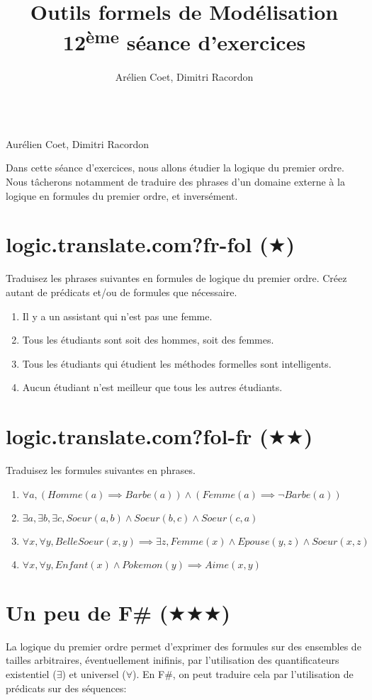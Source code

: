 \documentclass[a4paper, titlepage]{article}
\makeatletter
\numberwithin{figure}{section}
\numberwithin{table}{section}
\newcommand\objective[1]{\def\@objective{#1}}
\newcommand{\makecustomtitle}{%
	\begin{center}
		\huge\@title \\
		[1ex]\small Aurélien Coet, Dimitri Racordon \\
	\end{center}
	\@objective
}
\makeatother
\begin{document}
  \title{Outils formels de Modélisation \\ 12\textsuperscript{ème} séance d'exercices}
  \author{Arélien Coet, Dimitri Racordon}
	\objective{
    Dans cette séance d'exercices, nous allons étudier la logique du premier ordre.
    Nous tâcherons notamment de traduire des phrases d'un domaine externe à la logique
    en formules du premier ordre, et inversément.
  }

	\makecustomtitle

  \section{logic.translate.com?fr-fol ($\bigstar$)}
    Traduisez les phrases suivantes en formules de logique du premier ordre.
    Créez autant de prédicats et/ou de formules que nécessaire.
    \begin{enumerate}
      \item Il y a un assistant qui n'est pas une femme.
      \item Tous les étudiants sont soit des hommes, soit des femmes.
      \item Tous les étudiants qui étudient les méthodes formelles sont intelligents.
      \item Aucun étudiant n'est meilleur que tous les autres étudiants.
    \end{enumerate}

  \section{logic.translate.com?fol-fr ($\bigstar\bigstar$)}
    Traduisez les formules suivantes en phrases.
    \begin{enumerate}
      \item $\forall a, (Homme(a) \implies Barbe(a)) \land (Femme(a) \implies \lnot Barbe(a))$
      \item $\exists a, \exists b, \exists c, Soeur(a,b) \land Soeur(b,c) \land Soeur(c,a)$
      \item $\forall x, \forall y, BelleSoeur(x,y) \implies \exists z, Femme(x) \land Epouse(y,z) \land Soeur(x,z)$
      \item $\forall x, \forall y, Enfant(x) \land Pokemon(y) \implies Aime(x,y)$
    \end{enumerate}

  \pagebreak

  \section{Un peu de F\# ($\bigstar\bigstar\bigstar$)}
    La logique du premier ordre permet d'exprimer des formules sur des ensembles de tailles arbitraires,
    éventuellement inifinis,
    par l'utilisation des quantificateurs existentiel ($\exists$) et universel ($\forall$).
    En F\#, on peut traduire cela par l'utilisation de prédicats sur des séquences:
\end{document}
